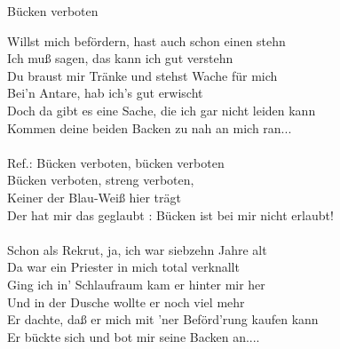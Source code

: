 \documentclass[a4paper,11pt]{article}
\begin{document}
\begin{song}{Bücken verboten}

Willst mich befördern, hast auch schon einen stehn\\
Ich muß sagen, das kann ich gut verstehn\\
Du braust mir Tränke und stehst Wache für mich\\
Bei'n Antare, hab ich's gut erwischt\\
Doch da gibt es eine Sache, die ich gar nicht leiden kann\\
Kommen deine beiden Backen zu nah an mich ran...\\
\\
Ref.: Bücken verboten, bücken verboten\\
Bücken verboten, streng verboten,\\
Keiner der Blau-Weiß hier trägt\\
Der hat mir das geglaubt : Bücken ist bei mir nicht erlaubt!\\
\\
Schon als Rekrut, ja, ich war siebzehn Jahre alt\\
Da war ein Priester in mich total verknallt\\
Ging ich in' Schlaufraum kam er hinter mir her\\
Und in der Dusche wollte er noch viel mehr\\
Er dachte, daß er mich mit  'ner Beförd'rung kaufen kann\\
Er bückte sich und bot mir seine Backen an....\\


\end{song}


\end{document}

